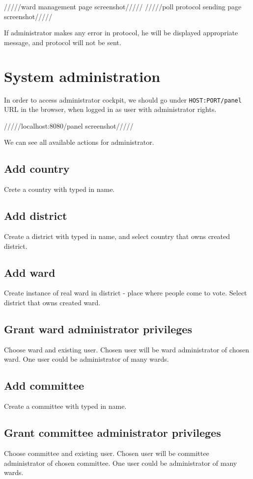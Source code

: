 \documentclass[a4paper,twoside,12pt]{book}
\begin{document}
      /////ward management page screenshot/////
      /////poll protocol sending page screenshot/////

      If administrator makes any error in protocol, he will be displayed appropriate message, and protocol will not be sent.

  \section{System administration}
    In order to access administrator cockpit, we should go under \lstinline|HOST:PORT/panel| URL in the browser, when logged in as user with administrator rights.

    /////localhost:8080/panel screenshot/////

    We can see all available actions for administrator.
    \subsection{Add country}
      Crete a country with typed in name. 

    \subsection{Add district}
      Create a district with typed in name, and select country that owns created district.

    \subsection{Add ward}
      Create instance of real ward in district - place where people come to vote. 
      Select district that owns created ward.

    \subsection{Grant ward administrator privileges}
      Choose ward and existing user. Chosen user will be ward administrator of chosen ward. One user could be administrator of many wards.

    \subsection{Add committee}
      Create a committee with typed in name.

    \subsection{Grant committee administrator privileges}
      Choose committee and existing user. Chosen user will be committee administrator of chosen committee. One user could be administrator of many wards.
\end{document}

